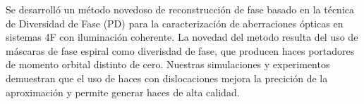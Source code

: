 




\begin{resumen}        %

Se desarrolló un método novedoso de reconstrucción de fase basado en
la técnica de Diversidad de Fase (PD) para la caracterización de
aberraciones ópticas en sistemas 4F con iluminación coherente. La
novedad del metodo resulta del uso de máscaras de fase espiral como
diverisdad de fase, que producen haces portadores de momento orbital
distinto de cero. Nuestras simulaciones y experimentos demuestran que
el uso de haces con dislocaciones mejora la precición de la
aproximación y permite generar haces de alta calidad. 


\end{resumen}





